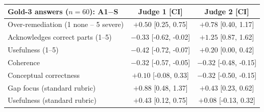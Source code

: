 \begin{tabular}{lcc}
\toprule
Gold-3 answers ($n{=}60$): A1$-$S & Judge 1 [CI] & Judge 2 [CI] \\
\midrule
Over-remediation (1 none -- 5 severe) & $+0.50$ [0.25, 0.75] & $+0.78$ [0.40, 1.17] \\
Acknowledges correct parts (1--5) & $-0.33$ [-0.62, -0.02] & $+1.25$ [0.87, 1.62] \\
Usefulness (1--5) & $-0.42$ [-0.72, -0.07] & $+0.20$ [0.00, 0.42] \\
Coherence & $-0.32$ [-0.57, -0.05] & $-0.32$ [-0.48, -0.15] \\
Conceptual correctness & $+0.10$ [-0.08, 0.33] & $-0.32$ [-0.50, -0.15] \\
Gap focus (standard rubric) & $+0.88$ [0.48, 1.37] & $+0.43$ [0.23, 0.62] \\
Usefulness (standard rubric) & $+0.43$ [0.12, 0.75] & $+0.08$ [-0.13, 0.32] \\
\bottomrule
\end{tabular}